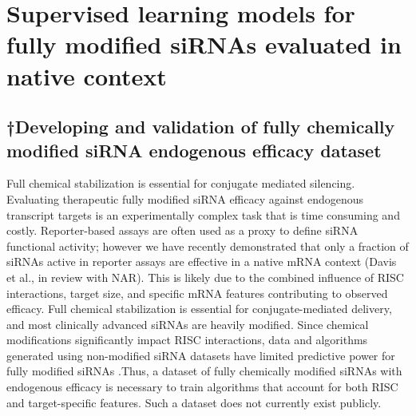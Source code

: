 \documentclass{report}
\begin{document}
\section{Supervised learning models for fully modified siRNAs evaluated in native context}


\subsection{†Developing and validation of fully chemically modified siRNA endogenous efficacy dataset}

Full chemical stabilization is essential for conjugate mediated silencing. Evaluating therapeutic fully modified siRNA efficacy against endogenous transcript targets is an experimentally complex task that is time consuming and costly. Reporter-based assays are often used as a proxy to define siRNA functional activity; however we have recently demonstrated that only a fraction of siRNAs active in reporter assays are effective in a native mRNA context (Davis et al., in review with NAR). This is likely due to the combined influence of RISC interactions, target size, and specific mRNA features contributing to observed efficacy. Full chemical stabilization is essential for conjugate-mediated delivery, and most clinically advanced siRNAs are heavily modified. Since chemical modifications significantly impact RISC interactions, data and algorithms generated using non-modified siRNA datasets have limited predictive power for fully modified siRNAs \cite{shmushkovich_functional_2018}.Thus, a dataset of fully chemically modified siRNAs with endogenous efficacy is necessary to train algorithms that account for both RISC and target-specific features. Such a dataset does not currently exist publicly. 
\end{document}
